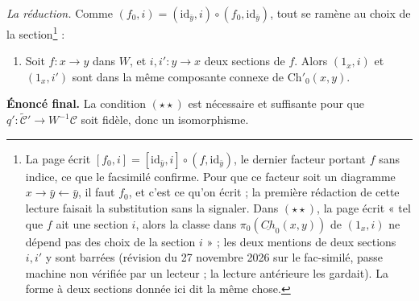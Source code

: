 \documentclass[11pt,a4paper]{article}
\begin{document}
\emph{La réduction.} Comme $(f_{0}, i) = (\mathrm{id}_{\bar{y}}, i) \circ
(f_{0}, \mathrm{id}_{\bar{y}})$, tout se ramène au choix de la
section\footnote{La page écrit $[f_{0}, i] = [\mathrm{id}_{\bar{y}}, i] \circ
(f, \mathrm{id}_{\bar{y}})$, le dernier facteur portant $f$ sans indice, ce
que le facsimilé confirme. Pour que ce facteur soit un diagramme
$x \to \bar{y} \leftarrow \bar{y}$, il faut $f_{0}$, et c'est ce qu'on écrit ;
la première rédaction de cette lecture faisait la substitution sans la
signaler. Dans $(\star\star)$, la page écrit « tel que $f$ ait une section
$i$, alors la classe dans $\pi_{0}(\underline{Ch}_{0}(x,y))$ de $(1_{x}, i)$
ne dépend pas des choix de la section $i$ » ; les deux mentions de deux
sections $i, i'$ y sont barrées (révision du 27 novembre 2026 sur le
fac-similé, passe machine non vérifiée par un lecteur ; la lecture antérieure
les gardait). La forme à deux sections donnée ici dit la même chose.} :

\begin{enumerate}
\item[$(\star\star)$] Soit $f : x \to y$ dans $W$, et $i, i' : y \to x$ deux
sections de $f$. Alors $(1_{x}, i)$ et $(1_{x}, i')$ sont dans la même
composante connexe de $\mathrm{Ch}'_{0}(x,y)$.
\end{enumerate}

\textbf{Énoncé final.} La condition $(\star\star)$ est nécessaire et suffisante
pour que $q' : \widetilde{\mathcal{C}}' \to W^{-1}\mathcal{C}$ soit fidèle,
donc un isomorphisme.
\end{document}
